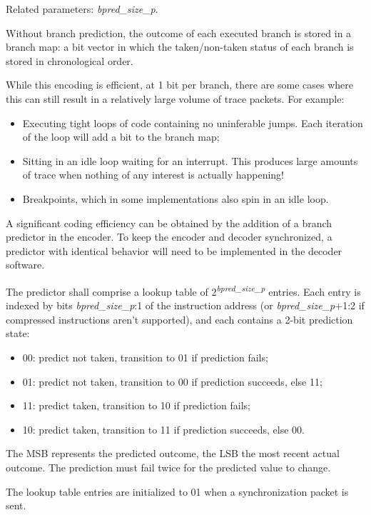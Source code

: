 Related parameters: \textit{bpred\_size\_p}.

Without branch prediction, the outcome of each executed branch is stored in
a branch map: a bit vector in which the taken/non-taken status of each branch is stored in
chronological order.

While this encoding is efficient, at 1 bit per branch, there are some cases where this
can still result in a relatively large volume of trace packets.  For example:

\begin{itemize}
  \item Executing tight loops of code containing no uninferable jumps.  Each iteration of the loop will add a bit 
  to the branch map;
  \item Sitting in an idle loop waiting for an interrupt.  This produces large amounts of trace when nothing of 
  any interest is actually happening!  
  \item Breakpoints, which in some implementations also spin in an idle loop.
\end{itemize}

A significant coding efficiency can be obtained by the addition of a branch predictor in the encoder. To keep
the encoder and decoder synchronized, a predictor with identical behavior will need to be implemented in the decoder
software.

The predictor shall comprise a lookup table of 2\textsuperscript{\textit{bpred\_size\_p}} entries.  
Each entry is indexed by bits \textit{bpred\_size\_p}:1 of the instruction address (or \textit{bpred\_size\_p}+1:2 if 
compressed instructions aren't supported), 
and each contains a 2-bit prediction state:
\begin{itemize}
  \item 00: predict not taken, transition to 01 if prediction fails;
  \item 01: predict not taken, transition to 00 if prediction succeeds, else 11;
  \item 11: predict taken, transition to 10 if prediction fails;
  \item 10: predict taken, transition to 11 if prediction succeeds, else 00.
\end{itemize}

The MSB represents the predicted outcome, the LSB the most recent actual outcome.  The prediction must fail twice
for the predicted value to change.

The lookup table entries are initialized to 01 when a synchronization packet is sent.

